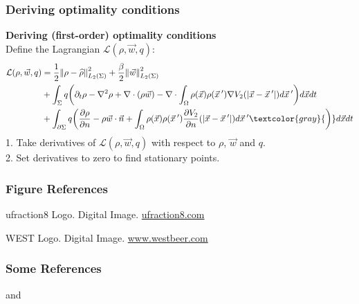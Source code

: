 \documentclass[aspectratio=169,xcolor=dvipsnames]{beamer}
\begin{document}
\begin{frame}
	\frametitle{Deriving optimality conditions}
	\textbf{Deriving (first-order) optimality conditions}\\
	Define the Lagrangian $\mathcal{L}(\rho, \vec{w}, q)$:
	\begin{align*}
		\mathcal{L}(\rho, \vec{w},q)&= \frac{1}{2}\norm{\rho- \widehat{\rho}}_{L_2(\Sigma)}^2 + \frac{\beta}{2} \norm{\vec{w}}_{L_2(\Sigma)}^2\\
		&+ \int_\Sigma q\bigg( \partial_t \rho - \nabla^2 \rho + \nabla \cdot (\rho \vec{w})
			- \nabla \cdot\int_\Omega \rho(\vec{x}) \rho(\vec{x}\hspace{0.2em}') \nabla V_2(|\vec{x}-\vec{x}\hspace{0.2em}'|)d\vec{x}\hspace{0.2em}'   \bigg) d\vec{x} dt\\
		&+ \int_{\partial \Sigma} q  \bigg(\frac{\partial \rho}{\partial n} - \rho \vec{w} \cdot \vec{n} +  \int_\Omega \rho(\vec{x}) \rho(\vec{x}\hspace{0.2em}')  \frac{ \partial  V_2}{\partial n}(|\vec{x}-\vec{x}\hspace{0.2em}'|)d\vec{x}\hspace{0.2em}' \textcolor{gray}{\bigg)} d\vec{x} dt\\
	\end{align*}
	1. Take derivatives of $\mathcal{L}(\rho, \vec{w}, q)$ with respect to $\rho$, $\vec{w}$ and $q$. \\
	2. Set derivatives to zero to find stationary points. \\
\end{frame}



\begin{frame}
	\frametitle{Figure References}   
	\begin{thebibliography}{10}    
		
		ufraction8 Logo. Digital Image. 
		\url{ufraction8.com}
		
		WEST Logo. Digital Image.  \url{www.westbeer.com}
	\end{thebibliography}	
\end{frame}
\begin{frame}
	\frametitle{Some References}    
	\cite{Us2020} and
	\cite{Author1990}
	
\end{frame}
\end{document}
